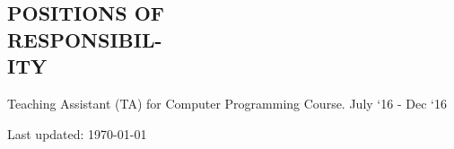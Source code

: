 \documentclass[margin]{res}
\begin{document}
\begin{resume}
  \section{POSITIONS OF\\ RESPONSIBIL-\\ITY}
    Teaching Assistant (TA) for Computer Programming Course. \hfill July `16 - Dec `16\\

\begin{center}
  \begin{footnotesize}
    Last updated: \today \\
  \end{footnotesize}
\end{center}

\end{resume}
\end{document}
